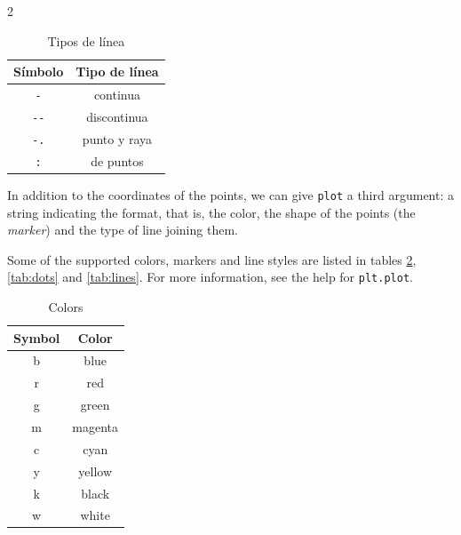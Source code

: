 \begin{paracol}{2}
      \begin{table}
        \centering
        \begin{tabular}{|c|c|} \hline
        \textbf{Símbolo}     &  \textbf{Tipo de línea}\\ \hline
             \texttt{-}& continua \\ \hline
             \texttt{-{}-}& discontinua\\ \hline
             \texttt{-.}& punto y raya \\ \hline
             \texttt{:}& de puntos\\ \hline
        \end{tabular}
        \caption{Tipos de línea}
        \label{tab:lineas}
    \end{table}
    \switchcolumn
In addition to the coordinates of the points, we can give \texttt{plot} a third argument: a string indicating the format, that is, the color, the shape of the points (the \emph{marker}) and the type of line joining them.

Some of the supported colors, markers and line styles are listed in tables \ref{tab:colours}, \ref{tab:dots} and \ref{tab:lines}. For more information, see the help for \texttt{plt.plot}.

    \begin{table}
        \centering
        \begin{tabular}{|c|c|} \hline
        \textbf{Symbol}     &  \textbf{Color}\\ \hline
             b& blue \\ \hline
             r& red \\ \hline
             g& green \\ \hline
             m& magenta\\ \hline
             c& cyan\\ \hline
             y& yellow\\ \hline
             k& black\\ \hline
             w& white\\ \hline
        \end{tabular}
        \caption{Colors}
        \label{tab:colours}
    \end{table}


\end{paracol}
